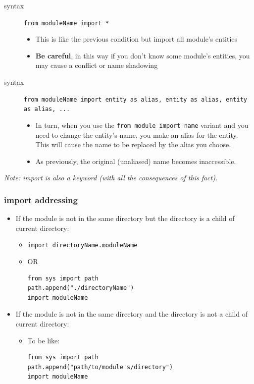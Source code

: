 \documentclass[11pt]{article}
\begin{document}
\begin{description}
\item[{syntax}] \texttt{from moduleName import *}
\begin{itemize}
\item This is like the previous condition but import all module's entities
\item \textbf{Be careful}, in this way if you don't know some module's
entities, you may cause a conflict or name shadowing
\end{itemize}

\item[{syntax}] \texttt{from moduleName import entity as alias, entity as alias, entity as alias, ...}
\begin{itemize}
\item In turn, when you use the \texttt{from module import name} variant and you
need to change the entity’s name, you make an alias for the
entity. This will cause the name to be replaced by the alias you
choose.
\item As previously, the original (unaliased) name becomes inaccessible.
\end{itemize}
\end{description}


\emph{Note: import is also a keyword (with all the
consequences of this fact).}

\subsubsection{import addressing}
\label{sec:orgeeea970}
\begin{itemize}
\item If the module is not in the same directory but the directory is a
child of current directory:
\begin{itemize}
\item \texttt{import directoryName.moduleName}
\item OR 
\begin{verbatim}
from sys import path
path.append("./directoryName")
import moduleName
\end{verbatim}
\end{itemize}
\item If the module is not in the same directory and the directory is not
a child of current directory:
\begin{itemize}
\item To be like:
\begin{verbatim}
from sys import path
path.append("path/to/module's/directory")
import moduleName
\end{verbatim}
\end{itemize}
\end{itemize}
\end{document}
